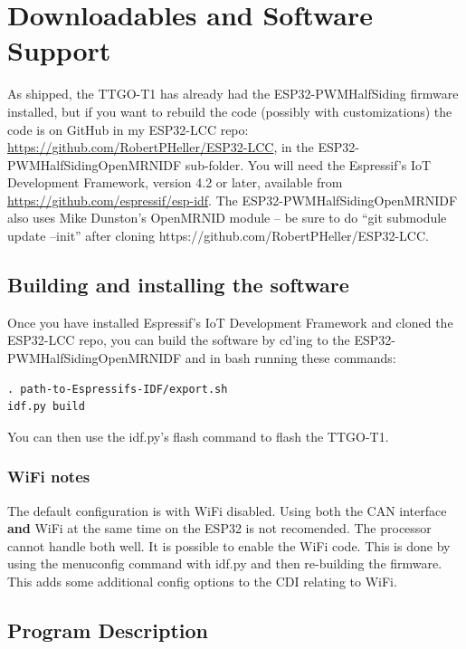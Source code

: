 \clearpage
\section{Downloadables and Software Support}

As shipped, the TTGO-T1 has already had the ESP32-PWMHalfSiding firmware
installed, but if you want to rebuild the code (possibly with customizations)
the code is on GitHub in my ESP32-LCC repo:
\url{https://github.com/RobertPHeller/ESP32-LCC}, in the
ESP32-PWMHalfSidingOpenMRNIDF sub-folder. You will need the Espressif's IoT
Development Framework, version 4.2 or later, available from
\url{https://github.com/espressif/esp-idf}. The ESP32-PWMHalfSidingOpenMRNIDF
also uses Mike Dunston's OpenMRNID module -- be sure to do ``git submodule
update --init'' after cloning https://github.com/RobertPHeller/ESP32-LCC.


\subsection{Building and installing the software}

Once you have installed Espressif's IoT Development Framework and cloned the 
ESP32-LCC repo, you can build the software by cd'ing to the 
ESP32-PWMHalfSidingOpenMRNIDF and in bash running these commands:

\begin{verbatim}
. path-to-Espressifs-IDF/export.sh
idf.py build
\end{verbatim}

You can then use the idf.py's flash command to flash the TTGO-T1.

\subsubsection{WiFi notes}

The default configuration is with WiFi disabled. Using both the CAN interface
\textbf{and} WiFi at the same time on the ESP32 is not recomended. The
processor cannot handle both well. It is possible to enable the WiFi code.
This is done by using the menuconfig command with idf.py and then re-building
the firmware. This adds some additional config options to the CDI relating to 
WiFi.

\subsection{Program Description}

